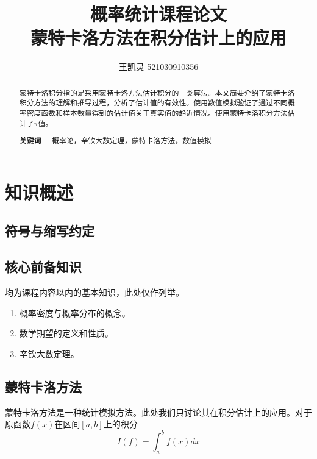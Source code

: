\documentclass[a4paper]{IEEEtran}
\title{\huge{概率统计课程论文\\
		蒙特卡洛方法在积分估计上的应用}
}
\author{王凯灵 521030910356}
\begin{document}
	\maketitle
	\begin{abstract}
		蒙特卡洛积分指的是采用蒙特卡洛方法估计积分的一类算法。本文简要介绍了蒙特卡洛积分方法的理解和推导过程，分析了估计值的有效性。使用数值模拟验证了通过不同概率密度函数和样本数量得到的估计值关于真实值的趋近情况。使用蒙特卡洛积分方法估计了$\pi$值。
		\par\textbf{关键词—}
		概率论，辛钦大数定理，蒙特卡洛方法，数值模拟
	\end{abstract}

	\section{知识概述}
	\subsection{符号与缩写约定}
	\begin{table}[h]
	\end{table}
	\subsection{核心前备知识}
	均为课程内容以内的基本知识，此处仅作列举。
	\begin{enumerate}
		\item 概率密度与概率分布的概念。
		\item 数学期望的定义和性质。
		\item 辛钦大数定理。
	\end{enumerate}
	\subsection{蒙特卡洛方法}
	蒙特卡洛方法是一种统计模拟方法。此处我们只讨论其在积分估计上的应用。对于原函数$f(x)$在区间$[a, b]$上的积分
	$$
	I(f)=\int_a^b f(x) d x
	$$
	
\end{document}
